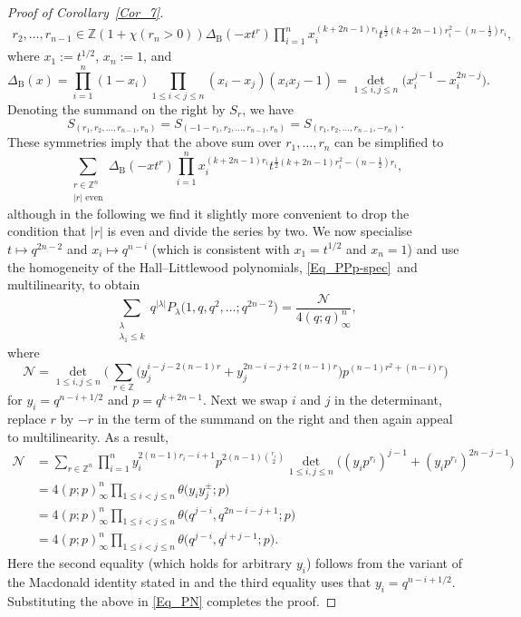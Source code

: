 \documentclass[pdftex]{sigma}
\numberwithin{equation}{section}
\renewcommand{\leq}{\leqslant}
\newcommand{\abs}[1]{\vert#1\vert}
\newcommand{\la}{\lambda}
\begin{document}
\begin{proof}[Proof of Corollary~\ref{Cor_7}]
\begin{align*}
{{r_2,\dots,r_{n-1}\in\mathbb{Z}}}
 (1+\chi(r_n>0) )
\Delta_{\mathrm{B}}(-xt^r) \prod_{i=1}^n x_i^{(k+2n-1)r_i}
t^{\frac{1}{2}(k+2n-1)r_i^2-(n-\frac{1}{2})r_i},
\end{align*}
where $x_1:=t^{1/2}$, $x_n:=1$, and
\[
\Delta_{\mathrm{B}}(x)=\prod_{i=1}^n (1-x_i)
\prod_{1\leq i<j\leq n} (x_i-x_j)(x_ix_j-1)
=\det_{1\leq i,j\leq n}\bigl(x_i^{j-1}-x_i^{2n-j}\bigr).
\]
Denoting the summand on the right by $S_r$, we have
\[
S_{(r_1,r_2,\dots,r_{n-1},r_n)}=
S_{(-1-r_1,r_2,\dots,r_{n-1},r_n)}=
S_{(r_1,r_2,\dots,r_{n-1},-r_n)}.
\]
These symmetries imply that the above sum over $r_1,\dots,r_n$
can be simplified to
\[
\sum_{\substack{r\in\mathbb{Z}^n\\[1pt] \abs{r} \text{ even}}}
\Delta_{\mathrm{B}}(-xt^r) \prod_{i=1}^n x_i^{(k+2n-1)r_i}
t^{\frac{1}{2}(k+2n-1)r_i^2-(n-\frac{1}{2})r_i},
\]
although in the following we find it slightly more convenient to
drop the condition that $\abs{r}$ is even and divide the series by
two.
We now specialise $t\mapsto q^{2n-2}$ and $x_i\mapsto q^{n-i}$
\big(which is consistent with $x_1=t^{1/2}$ and $x_n=1$\big) and use the
homogeneity of the Hall--Littlewood polynomials, \eqref{Eq_PPp-spec}~and multilinearity, to obtain
\begin{equation}\label{Eq_PN}
\sum_{\substack{\la \\[1pt] \la_1\leq k}} q^{\abs{\la}}
P_{\la}\bigl(1,q,q^2,\dots;q^{2n-2}\bigr)
=\frac{\mathcal{N}}{4(q;q)_{\infty}^n},
\end{equation}
where
\[
\mathcal{N}=
\det_{1\leq i,j\leq n} \biggl(\, \sum_{r\in\mathbb{Z}}
\bigl(y_j^{i-j-2(n-1)r}+y_j^{2n-i-j+2(n-1)r}\bigr)
p^{(n-1)r^2+(n-i)r}\biggr)
\]
for $y_i=q^{n-i+1/2}$ and $p=q^{k+2n-1}$.
Next we swap $i$ and $j$ in the determinant, replace $r$ by $-r$ in the
term of the summand on the right and then again appeal to multilinearity.
As a result,
\begin{align*}
\mathcal{N}&=\sum_{r\in\mathbb{Z}^n}
\prod_{i=1}^n y_i^{2(n-1)r_i-i+1} p^{2(n-1)\binom{r_i}{2}}
\det_{1\leq i,j\leq n}\bigl((y_ip^{r_i})^{j-1}+(y_ip^{r_i})^{2n-j-1}\bigr)
\\[2mm]
&=4(p;p)_{\infty}^n\prod_{1\leq i<j\leq n} \theta\bigl(y_iy_j^{\pm};p\bigr) \\
&=4(p;p)_{\infty}^n\prod_{1\leq i<j\leq n} \theta\bigl(q^{j-i},q^{2n-i-j+1};p\bigr) \\
&=4(p;p)_{\infty}^n\prod_{1\leq i<j\leq n} \theta\bigl(q^{j-i},q^{i+j-1};p\bigr).
\end{align*}
Here the second equality (which holds for arbitrary $y_i$) follows from
the variant of the  Macdonald identity stated in
\cite[Appendix A.2]{KRTW24} and the third equality uses that
$y_i=q^{n-i+1/2}$.
Substituting the above in \eqref{Eq_PN} completes the proof.
\end{proof}
\end{document}
